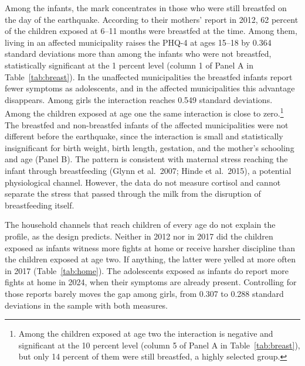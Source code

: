 \documentclass[12pt]{article}
\begin{document}
Among the infants, the mark concentrates in those who were still breastfed
on the day of the earthquake. According to their mothers' report in 2012,
62 percent of the children exposed at 6--11 months were breastfed at the
time. Among them, living in an affected municipality raises the PHQ-4 at
ages 15--18 by 0.364 standard deviations more than among the infants who
were not breastfed, statistically significant at the 1 percent level
(column 1 of Panel A in Table~\ref{tab:breast}). In the unaffected
municipalities the breastfed infants report fewer symptoms as
adolescents, and in the affected municipalities this advantage
disappears. Among girls the interaction reaches 0.549 standard
deviations. Among the children exposed
at age one the same interaction is close to zero.\footnote{Among the
children exposed at age two the interaction is negative and significant at
the 10 percent level (column 5 of Panel A in Table~\ref{tab:breast}), but
only 14 percent of them were still breastfed, a highly selected group.} The
breastfed and non-breastfed infants of the affected municipalities were not
different before the earthquake, since the interaction is small and
statistically insignificant for birth weight, birth length, gestation, and
the mother's schooling and age (Panel B). The pattern is consistent with
maternal stress reaching the infant through breastfeeding (Glynn et al.\
2007; Hinde et al.\ 2015), a potential physiological channel. However, the
data do not measure cortisol and cannot separate the stress that passed
through the milk from the disruption of breastfeeding itself.

The household channels that reach children of every age do not explain the
profile, as the design predicts. Neither in 2012 nor in 2017 did the
children exposed as infants witness more fights at home or receive harsher
discipline than the children exposed at age two. If anything, the latter
were yelled at more often in 2017 (Table~\ref{tab:home}). The adolescents
exposed as infants do report more fights at home in 2024, when their
symptoms are already present. Controlling for those reports barely moves
the gap among girls, from 0.307 to 0.288 standard deviations in the sample
with both measures.
\end{document}
